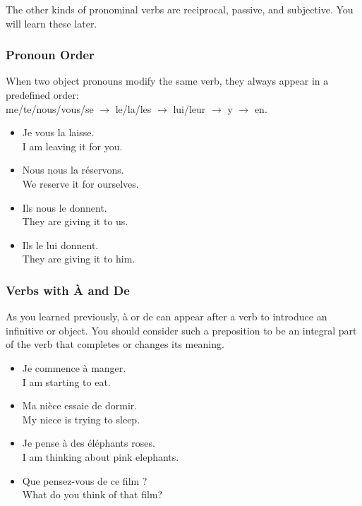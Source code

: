 The other kinds of pronominal verbs are reciprocal, passive, and subjective. You will learn these later.

\subsubsection{Pronoun Order}

When two object pronouns modify the same verb, they always appear in a predefined order: \\
me/te/nous/vous/se $\rightarrow$ le/la/les $\rightarrow$ lui/leur $\rightarrow$ y $\rightarrow$ en.

\begin{itemize}
  \item  Je vous la laisse. \\ I am leaving it for you.
	\item  Nous nous la r{\'e}servons. \\ We reserve it for ourselves.
	\item  Ils nous le donnent. \\ They are giving it to us.
	\item  Ils le lui donnent. \\ They are giving it to him.
\end{itemize}

\subsubsection{Verbs with {\`A} and De}

As you learned previously, {\`a} or de can appear after a verb to introduce an infinitive or object. You should consider such a preposition to be an integral part of the verb that completes or changes its meaning.

\begin{itemize}
  \item  Je commence {\`a} manger. \\ I am starting to eat.
	\item  Ma ni{\`e}ce essaie de dormir. \\ My niece is trying to sleep.
	\item  Je pense {\`a} des {\'e}l{\'e}phants roses. \\ I am thinking about pink elephants.
	\item  Que pensez-vous de ce film ? \\ What do you think of that film?
\end{itemize}


